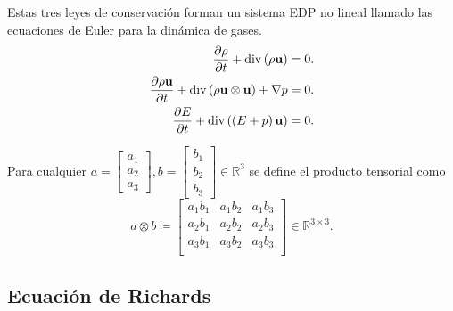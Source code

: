 Estas tres leyes de conservación forman un sistema EDP no lineal
llamado las ecuaciones de Euler para la dinámica de gases.
\begin{align}
	\diffp{\rho}{t}+
	\operatorname{div}
	\left(\rho\mathbf{u}\right)             & =
	0.                                          \\
	\diffp{\rho\mathbf{u}}{t}+
	\operatorname{div}
	\left(\rho\mathbf{u}\otimes\mathbf{u}\right)+
	\nabla p                                & =
	0.                                          \\
	\diffp{E}{t}+
	\operatorname{div}
	\left(\left(E+p\right)\mathbf{u}\right) & =
	0.
\end{align}

Para cualquier
\begin{math}
	a=
	\begin{bmatrix}
		a_{1} \\
		a_{2} \\
		a_{3}
	\end{bmatrix},
	b=
	\begin{bmatrix}
		b_{1} \\
		b_{2} \\
		b_{3}
	\end{bmatrix}\in\mathbb{R}^{3}
\end{math}
se define el producto tensorial como
\begin{equation*}
	a\otimes b\coloneqq
	\begin{bmatrix}
		a_{1}b_{1} & a_{1}b_{2} & a_{1}b_{3} \\
		a_{2}b_{1} & a_{2}b_{2} & a_{2}b_{3} \\
		a_{3}b_{1} & a_{3}b_{2} & a_{3}b_{3} \\
	\end{bmatrix}\in\mathbb{R}^{3\times 3}.
\end{equation*}

\subsection*{Ecuación de Richards}

